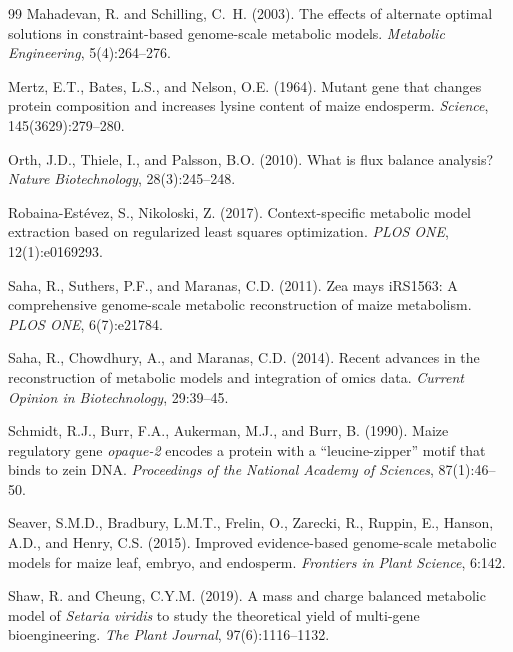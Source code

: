 \documentclass[12pt,a4paper]{article}
\begin{document}
\begin{thebibliography}{99}
Mahadevan, R. and Schilling, C.~H. (2003).
The effects of alternate optimal solutions in constraint-based genome-scale metabolic models.
\textit{Metabolic Engineering}, 5(4):264--276.

Mertz, E.T., Bates, L.S., and Nelson, O.E. (1964).
\newblock Mutant gene that changes protein composition and increases lysine content of maize endosperm.
\newblock \textit{Science}, 145(3629):279--280.

Orth, J.D., Thiele, I., and Palsson, B.O. (2010).
\newblock What is flux balance analysis?
\newblock \textit{Nature Biotechnology}, 28(3):245--248.

Robaina-Est\'{e}vez, S., Nikoloski, Z. (2017).
\newblock Context-specific metabolic model extraction based on regularized least squares optimization.
\newblock \textit{PLOS ONE}, 12(1):e0169293.

Saha, R., Suthers, P.F., and Maranas, C.D. (2011).
\newblock Zea mays iRS1563: A comprehensive genome-scale metabolic reconstruction of maize metabolism.
\newblock \textit{PLOS ONE}, 6(7):e21784.

Saha, R., Chowdhury, A., and Maranas, C.D. (2014).
\newblock Recent advances in the reconstruction of metabolic models and integration of omics data.
\newblock \textit{Current Opinion in Biotechnology}, 29:39--45.

Schmidt, R.J., Burr, F.A., Aukerman, M.J., and Burr, B. (1990).
\newblock Maize regulatory gene \textit{opaque-2} encodes a protein with a ``leucine-zipper'' motif that binds to zein DNA.
\newblock \textit{Proceedings of the National Academy of Sciences}, 87(1):46--50.

Seaver, S.M.D., Bradbury, L.M.T., Frelin, O., Zarecki, R., Ruppin, E., Hanson, A.D., and Henry, C.S. (2015).
\newblock Improved evidence-based genome-scale metabolic models for maize leaf, embryo, and endosperm.
\newblock \textit{Frontiers in Plant Science}, 6:142.

Shaw, R. and Cheung, C.Y.M. (2019).
\newblock A mass and charge balanced metabolic model of \textit{Setaria viridis} to study the theoretical yield of multi-gene bioengineering.
\newblock \textit{The Plant Journal}, 97(6):1116--1132.


\end{thebibliography}
\end{document}
